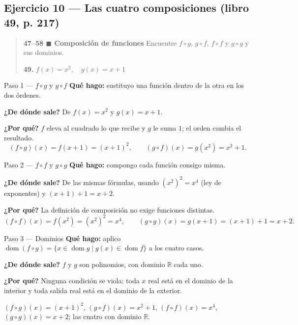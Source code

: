 \documentclass[11pt]{article}
\begin{document}
\subsection*{Ejercicio 10 — Las cuatro composiciones (libro 49, p. 217)}

\begin{quote}
\textbf{47--58 $\blacksquare$ Composición de funciones} \quad Encuentre $f\circ g$, $g\circ f$, $f\circ f$ y $g\circ g$ y sus dominios.

\textbf{49.} $f(x)=x^2, \quad g(x)=x+1$
\end{quote}

\begin{paso}{Paso 1 --- $f\circ g$ y $g\circ f$}
\textbf{Qué hago:} sustituyo una función dentro de la otra en los dos órdenes.

\textbf{¿De dónde sale?} De $f(x)=x^2$ y $g(x)=x+1$.

\textbf{¿Por qué?} $f$ eleva al cuadrado lo que recibe y $g$ le suma $1$; el orden cambia el resultado.
\[
(f\circ g)(x)=f(x+1)=(x+1)^2,\qquad (g\circ f)(x)=g(x^2)=x^2+1 .
\]
\end{paso}

\begin{paso}{Paso 2 --- $f\circ f$ y $g\circ g$}
\textbf{Qué hago:} compongo cada función consigo misma.

\textbf{¿De dónde sale?} De las mismas fórmulas, usando $(x^2)^2=x^4$ (ley de exponentes) y $(x+1)+1=x+2$.

\textbf{¿Por qué?} La definición de composición no exige funciones distintas.
\[
(f\circ f)(x)=f(x^2)=(x^2)^2=x^4,\qquad (g\circ g)(x)=g(x+1)=(x+1)+1=x+2 .
\]
\end{paso}

\begin{paso}{Paso 3 --- Dominios}
\textbf{Qué hago:} aplico $\operatorname{dom}(f\circ g)=\{x\in\operatorname{dom} g \mid g(x)\in\operatorname{dom} f\}$ a los cuatro casos.

\textbf{¿De dónde sale?} $f$ y $g$ son polinomios, con dominio $\mathbb{R}$ cada uno.

\textbf{¿Por qué?} Ninguna condición se viola: toda $x$ real está en el dominio de la interior y toda salida real está en el dominio de la exterior.
\end{paso}

\begin{resp}
$(f\circ g)(x)=(x+1)^2$, $(g\circ f)(x)=x^2+1$, $(f\circ f)(x)=x^4$, $(g\circ g)(x)=x+2$; las cuatro con dominio $\mathbb{R}$.
\end{resp}
\end{document}
